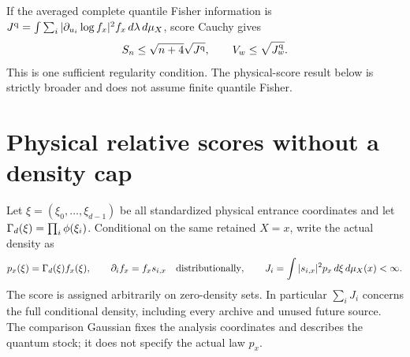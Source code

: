 \documentclass[11pt]{article}
\numberwithin{equation}{section}
\theoremstyle{definition}
\theoremstyle{remark}
\begin{document}
If the averaged complete quantile Fisher information is
$J^{\rm q}=\int\sum_i|\partial_{u_i}\log f_x|^2 f_x\,d\lambda\,d\mu_X$,
score Cauchy gives
\begin{equation}\label{p1p:eq:quantilescore}
 S_n\leq\sqrt{n+4}\sqrt{J^{\rm q}},\qquad V_w\leq\sqrt{J_w^{\rm q}}.
\end{equation}
This is one sufficient regularity condition. The physical-score result
below is strictly broader and does not assume finite quantile Fisher.

\section{Physical relative scores without a density cap}
\label{p1p:sec:physical}

Let $\xi=(\xi_0,\ldots,\xi_{d-1})$ be all standardized physical entrance
coordinates and let $\Gamma_d(\xi)=\prod_i\phi(\xi_i)$. Conditional on the
same retained $X=x$, write the actual density as
\begin{equation}\label{p1p:eq:relative}
 p_x(\xi)=\Gamma_d(\xi)f_x(\xi),\qquad
 \partial_i f_x=f_xs_{i,x}\quad\hbox{distributionally},\qquad
 J_i=\int |s_{i,x}|^2p_x\,d\xi\,d\mu_X(x)<\infty.
\end{equation}
The score is assigned arbitrarily on zero-density sets. In particular
$\sum_iJ_i$ concerns the full conditional density, including every
archive and unused future source. The comparison Gaussian fixes the
analysis coordinates and describes the quantum stock; it does not
specify the actual law $p_x$.
\end{document}
